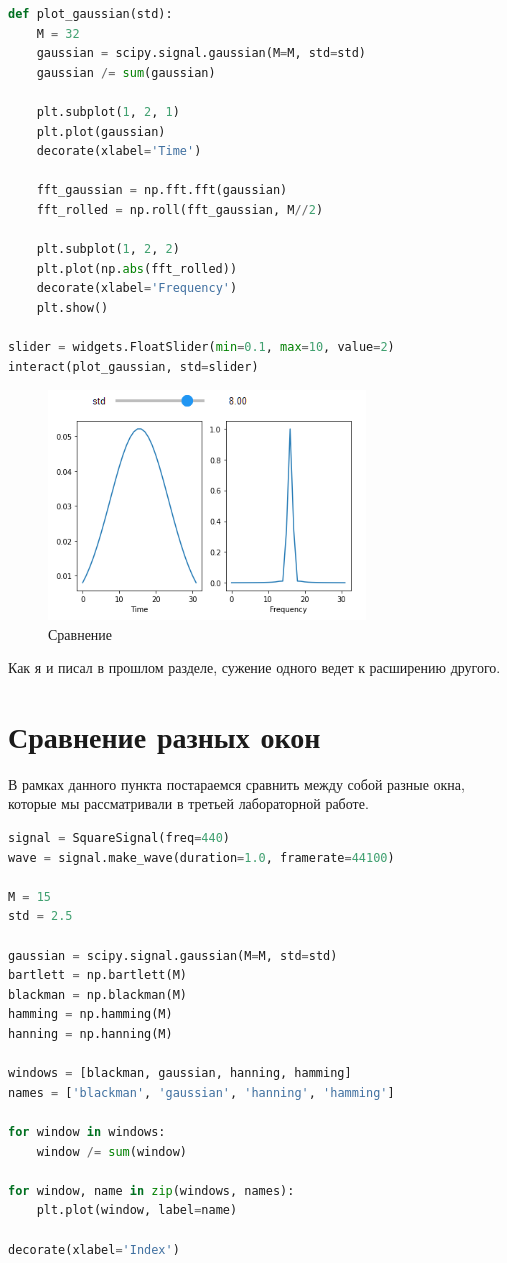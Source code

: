 \documentclass[a4paper,12pt]{report}
\begin{document}
\begin{lstlisting}[language=Python,caption=Импорты]
def plot_gaussian(std):
    M = 32
    gaussian = scipy.signal.gaussian(M=M, std=std)
    gaussian /= sum(gaussian)
    
    plt.subplot(1, 2, 1)
    plt.plot(gaussian)
    decorate(xlabel='Time')

    fft_gaussian = np.fft.fft(gaussian)
    fft_rolled = np.roll(fft_gaussian, M//2)
    
    plt.subplot(1, 2, 2)
    plt.plot(np.abs(fft_rolled))
    decorate(xlabel='Frequency')
    plt.show()

slider = widgets.FloatSlider(min=0.1, max=10, value=2)
interact(plot_gaussian, std=slider)
\end{lstlisting}
    
    \begin{figure}[H]
        \centering
        \includegraphics[width=0.75\textwidth]{images/ex2_comparison.png}
        \caption{Сравнение}
        \label{fig:ex2_comparison}
    \end{figure}
    
    Как я и писал в прошлом разделе, сужение одного  ведет к расширению другого.
    
    \chapter{Сравнение разных окон}
    
    В рамках данного пункта постараемся сравнить между собой разные окна, которые мы рассматривали в третьей лабораторной работе.
    
\begin{lstlisting}[language=Python,caption=Создание окон]
signal = SquareSignal(freq=440)
wave = signal.make_wave(duration=1.0, framerate=44100)

M = 15
std = 2.5

gaussian = scipy.signal.gaussian(M=M, std=std)   
bartlett = np.bartlett(M)
blackman = np.blackman(M)
hamming = np.hamming(M)
hanning = np.hanning(M)

windows = [blackman, gaussian, hanning, hamming]
names = ['blackman', 'gaussian', 'hanning', 'hamming']

for window in windows:
    window /= sum(window)
    
for window, name in zip(windows, names):
    plt.plot(window, label=name)

decorate(xlabel='Index')
\end{lstlisting}
\end{document}
